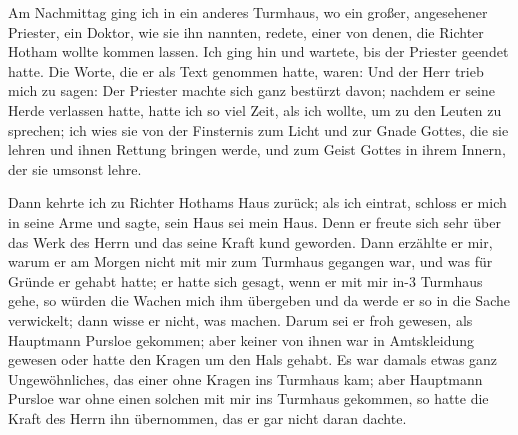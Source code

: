 Am Nachmittag ging ich in ein anderes Turmhaus, wo ein
großer, angesehener Priester, ein Doktor, wie sie ihn nannten,
redete, einer von denen, die Richter Hotham wollte kommen lassen.
Ich ging hin und wartete, bis der Priester geendet hatte. Die
Worte, die er als Text genommen hatte, waren:  Und der Herr
trieb mich zu sagen:  
Der Priester machte sich
ganz bestürzt davon; nachdem er seine Herde verlassen hatte,
hatte ich so viel Zeit, als ich wollte, um zu den Leuten zu sprechen;
ich wies sie von der Finsternis zum Licht und zur Gnade Gottes,
die sie lehren und ihnen Rettung bringen werde, und zum Geist
Gottes in ihrem Innern, der sie umsonst lehre.

Dann kehrte ich zu Richter Hothams Haus zurück; als ich
eintrat, schloss er mich in seine Arme und sagte, sein Haus sei
mein Haus. Denn er freute sich sehr über das Werk des Herrn
und das seine Kraft kund geworden. Dann erzählte er mir,
warum er am Morgen nicht mit mir zum Turmhaus gegangen
war, und was für Gründe er gehabt hatte; er hatte sich gesagt,
wenn er mit mir in-3 Turmhaus gehe, so würden die Wachen
mich ihm übergeben und da werde er so in die Sache verwickelt;
dann wisse er nicht, was machen. Darum sei er froh gewesen,
als Hauptmann Pursloe gekommen; aber keiner von ihnen war
in Amtskleidung gewesen oder hatte den Kragen um den Hals 
gehabt. Es war damals etwas ganz Ungewöhnliches, das einer
ohne Kragen ins Turmhaus kam; aber Hauptmann Pursloe
war ohne einen solchen mit mir ins Turmhaus gekommen, so hatte
die Kraft des Herrn ihn übernommen, das er gar nicht daran
dachte.


